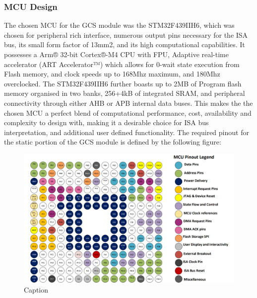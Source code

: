 \subsubsection{MCU Design}
The chosen MCU for the GCS module was the STM32F439IIH6, which was chosen for peripheral rich interface, numerous output pins necessary for the ISA bus, its small form factor of 13mm2, and its high computational capabilities. It possesses a Arm® 32-bit Cortex®-M4 CPU with FPU, Adaptive real-time accelerator (ART Accelerator™) which allows for  0-wait state execution from Flash memory, and clock speeds up to 168Mhz maximum, and 180Mhz overclocked. 
\break
\break
The STM32F439IIH6 further boasts up to 2MB of Program flash memory organised in two banks, 256+4kB of integrated SRAM, and peripheral connectivity through either AHB or APB internal data buses. This makes the the chosen MCU a perfect blend of computational performance, cost, availability and complexity to design with, making it a desirable choice for ISA bus interpretation, and additional user defined functionality. The required pinout for the static portion of the GCS module is defined by the following figure:
\begin{figure}[h]
    \centering
    \includegraphics[width=1.1\linewidth]{img/Pinout MCU labelled.PNG}
    \caption{Caption}
    \label{fig:enter-label}
\end{figure}

\pagebreak

